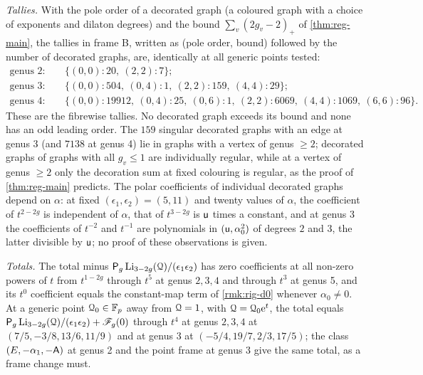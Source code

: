 \emph{Tallies.} With the pole order of a decorated graph (a coloured graph with a choice of exponents and dilaton degrees) and the bound $\sum_v(2g_v-2)_+$ of \cref{thm:reg-main}, the tallies in frame B, written as (pole order, bound) followed by the number of decorated graphs, are, identically at all generic points tested:
\begin{align*}
\text{genus }2\colon&\quad\{(0,0)\colon 20,\ (2,2)\colon 7\};\\
\text{genus }3\colon&\quad\{(0,0)\colon 504,\ (0,4)\colon 1,\ (2,2)\colon 159,\ (4,4)\colon 29\};\\
\text{genus }4\colon&\quad\{(0,0)\colon 19912,\ (0,4)\colon 25,\ (0,6)\colon 1,\ (2,2)\colon 6069,\ (4,4)\colon 1069,\ (6,6)\colon 96\}.
\end{align*}
These are the fibrewise tallies. No decorated graph exceeds its bound and none has an odd leading order. The $159$ singular decorated graphs with an edge at genus 3 (and $7138$ at genus 4) lie in graphs with a vertex of genus $\geq 2$; decorated graphs of graphs with all $g_v\leq 1$ are individually regular, while at a vertex of genus $\geq 2$ only the decoration sum at fixed colouring is regular, as the proof of \cref{thm:reg-main} predicts. The polar coefficients of individual decorated graphs depend on $\alpha$: at fixed $(\epsilon_1,\epsilon_2)=(5,11)$ and twenty values of $\alpha$, the coefficient of $t^{2-2g}$ is independent of $\alpha$, that of $t^{3-2g}$ is $\mathsf{u}$ times a constant, and at genus 3 the coefficients of $t^{-2}$ and $t^{-1}$ are polynomials in $(\mathsf{u},\alpha_0^2)$ of degrees $2$ and $3$, the latter divisible by $\mathsf{u}$; no proof of these observations is given.

\emph{Totals.} The total minus $\mathsf{P}_{g}\operatorname{Li}_{3-2g}(\mathcal{Q})/(\epsilon_1\epsilon_2)$ has zero coefficients at all non-zero powers of $t$ from $t^{1-2g}$ through $t^5$ at genus $2,3,4$ and through $t^3$ at genus 5, and its $t^0$ coefficient equals the constant-map term of \cref{rmk:rig-d0} whenever $\alpha_0\neq 0$. At a generic point $\mathcal{Q}_0\in\mathbb{F}_p$ away from $\mathcal{Q}=1$, with $\mathcal{Q}=\mathcal{Q}_0\mathrm{e}^t$, the total equals $\mathsf{P}_{g}\operatorname{Li}_{3-2g}(\mathcal{Q})/(\epsilon_1\epsilon_2)+\mathscr{F}_g(0)$ through $t^4$ at genus $2,3,4$ at $(7/5,-3/8,13/6,11/9)$ and at genus 3 at $(-5/4,19/7,2/3,17/5)$; the class $(E,-\alpha_1,-\mathsf{A})$ at genus 2 and the point frame at genus 3 give the same total, as a frame change must.

